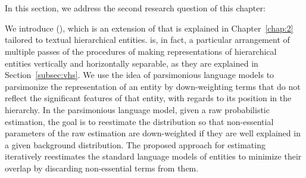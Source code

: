 \section{\HSWLMs}
\label{sec:hswlm}
In this section, we address the second research question of this chapter:

We introduce \HSWLMs (\achswlm), which is an extension of \SWLM that is explained in Chapter~\ref{chap:2} tailored to textual hierarchical entities. \achswlm is, in fact, a particular arrangement of multiple passes of the procedures of making representations of hierarchical entities vertically and horizontally separable, as they are explained in Section~\ref{subsec:vhs}.
%
We use the idea of parsimonious language models \cite{Hiemstra:2004} to parsimonize the representation of an entity by down-weighting terms that do not reflect the significant features of that entity, with regards to its position in the hierarchy.   
In the parsimonious language model, given a raw probabilistic estimation, the goal is to reestimate the distribution so that non-essential parameters of the raw estimation are down-weighted if they are well explained in a given background distribution. 
The proposed approach for estimating \hswlm iteratively reestimates the standard language models of entities to minimize their overlap by discarding non-essential terms from them. 

